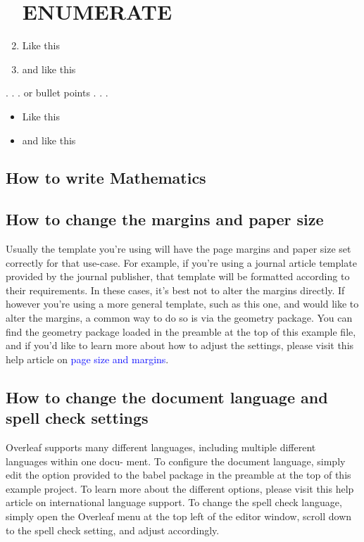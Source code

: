\documentclass{article}
\begin{document}
    \begin{enumerate}
    	
    	
     \section{ENUMERATE}
     \item Like this
     \item and like this
     
     
    \end{enumerate}
. . . or bullet points . . .
\begin{itemize}
	\section{itemize}
	\item Like this
	\item and like this
\end{itemize}
\subsection{How to write Mathematics}

    
   \subsection{How to change the margins and paper size}
   Usually the template you’re using will have the page margins and paper size set correctly for that
   use-case. For example, if you’re using a journal article template provided by the journal publisher,
   that template will be formatted according to their requirements. In these cases, it’s best not to alter
   the margins directly.
   If however you’re using a more general template, such as this one, and would like to alter the
   margins, a common way to do so is via the geometry package. You can find the geometry package
   loaded in the preamble at the top of this example file, and if you’d like to learn more about how to
   adjust the settings, please visit this help article on \textcolor{blue}{page size and margins}.
   
   \subsection{How to change the document language and spell check settings}
   Overleaf supports many different languages, including multiple different languages within one docu-
   ment.
   To configure the document language, simply edit the option provided to the babel package in the
   preamble at the top of this example project. To learn more about the different options, please visit
   this help article on international language support.
   To change the spell check language, simply open the Overleaf menu at the top left of the editor
   window, scroll down to the spell check setting, and adjust accordingly.
\end{document}
